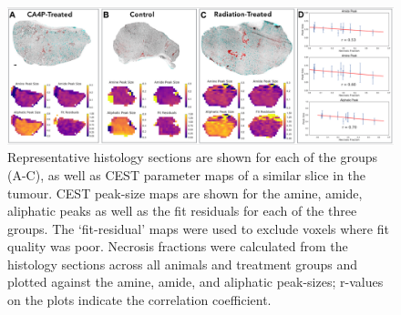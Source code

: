 \begin{figure}[htbp]
\begin{center}
\includegraphics[width=\textwidth]{cest/cest-images/cest_RTstudy}
\caption{Representative histology sections are shown for each of the groups (A-C), as well as CEST parameter maps of a similar slice in the tumour.
CEST peak-size maps are shown for the amine, amide, aliphatic peaks as well as the fit residuals for each of the three groups.
The `fit-residual' maps were used to exclude voxels where fit quality was poor.
Necrosis fractions were calculated from the histology sections across all animals and treatment groups and plotted against the amine, amide, and aliphatic peak-sizes; r-values on the plots indicate the correlation coefficient.}
\label{cestFractions}
\end{center}
\end{figure}




\endinput

Any text after an \endinput is ignored.
You could put scraps here or things in progress.

